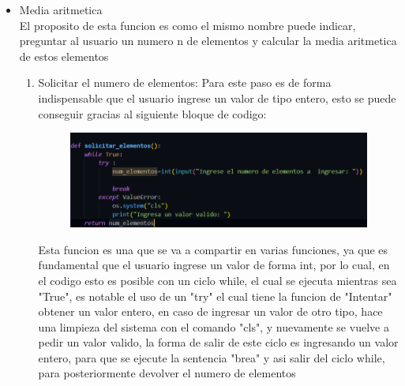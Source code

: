 \documentclass[12pt]{article}
\begin{document}
\begin{itemize}

\item Media aritmetica\\
El proposito de esta funcion es como el mismo nombre puede indicar, preguntar al usuario un numero n de elementos y calcular la media aritmetica de estos elementos
\begin{enumerate}

\item Solicitar el numero de elementos: Para este paso es de forma indispensable que el usuario ingrese un valor de tipo entero, esto se puede conseguir gracias al siguiente bloque de codigo: 
\begin{figure}[H]
	\begin{center}
 		\includegraphics[width = .8\textwidth]{solicitar_elementos.png}
	\end{center} 
\end{figure}

Esta funcion es una que se va a compartir en varias funciones, ya que es fundamental que el usuario ingrese un valor de forma int, por lo cual, en el codigo esto es posible con un ciclo while, el cual se ejecuta mientras sea "True", es notable el uso de un "try" el cual tiene la funcion de "Intentar" obtener un valor entero, en caso de ingresar un valor de otro tipo, hace una limpieza del sistema con el comando "cls", y nuevamente se vuelve a pedir un valor valido, la forma de salir de este ciclo es ingresando un valor entero, para que se ejecute la sentencia "brea" y asi salir del ciclo while, para posteriormente devolver el numero de elementos
\\



\end{enumerate}
\end{itemize}
\end{document}
